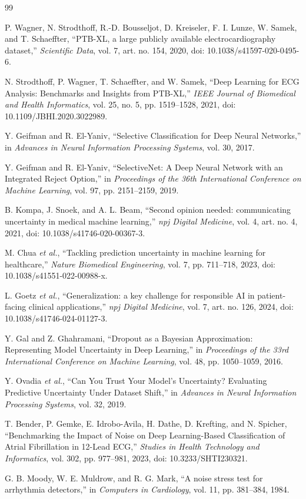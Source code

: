 \documentclass[journal]{IEEEtran}
\begin{document}
\balance
\begin{thebibliography}{99}

P. Wagner, N. Strodthoff, R.-D. Bousseljot, D. Kreiseler, F. I. Lunze, W. Samek, and T. Schaeffter, ``PTB-XL, a large publicly available electrocardiography dataset,'' \emph{Scientific Data}, vol. 7, art. no. 154, 2020, doi: 10.1038/s41597-020-0495-6.

N. Strodthoff, P. Wagner, T. Schaeffter, and W. Samek, ``Deep Learning for ECG Analysis: Benchmarks and Insights from PTB-XL,'' \emph{IEEE Journal of Biomedical and Health Informatics}, vol. 25, no. 5, pp. 1519--1528, 2021, doi: 10.1109/JBHI.2020.3022989.

Y. Geifman and R. El-Yaniv, ``Selective Classification for Deep Neural Networks,'' in \emph{Advances in Neural Information Processing Systems}, vol. 30, 2017.

Y. Geifman and R. El-Yaniv, ``SelectiveNet: A Deep Neural Network with an Integrated Reject Option,'' in \emph{Proceedings of the 36th International Conference on Machine Learning}, vol. 97, pp. 2151--2159, 2019.

B. Kompa, J. Snoek, and A. L. Beam, ``Second opinion needed: communicating uncertainty in medical machine learning,'' \emph{npj Digital Medicine}, vol. 4, art. no. 4, 2021, doi: 10.1038/s41746-020-00367-3.

M. Chua \emph{et al.}, ``Tackling prediction uncertainty in machine learning for healthcare,'' \emph{Nature Biomedical Engineering}, vol. 7, pp. 711--718, 2023, doi: 10.1038/s41551-022-00988-x.

L. Goetz \emph{et al.}, ``Generalization: a key challenge for responsible AI in patient-facing clinical applications,'' \emph{npj Digital Medicine}, vol. 7, art. no. 126, 2024, doi: 10.1038/s41746-024-01127-3.

Y. Gal and Z. Ghahramani, ``Dropout as a Bayesian Approximation: Representing Model Uncertainty in Deep Learning,'' in \emph{Proceedings of the 33rd International Conference on Machine Learning}, vol. 48, pp. 1050--1059, 2016.

Y. Ovadia \emph{et al.}, ``Can You Trust Your Model's Uncertainty? Evaluating Predictive Uncertainty Under Dataset Shift,'' in \emph{Advances in Neural Information Processing Systems}, vol. 32, 2019.

T. Bender, P. Gemke, E. Idrobo-Avila, H. Dathe, D. Krefting, and N. Spicher, ``Benchmarking the Impact of Noise on Deep Learning-Based Classification of Atrial Fibrillation in 12-Lead ECG,'' \emph{Studies in Health Technology and Informatics}, vol. 302, pp. 977--981, 2023, doi: 10.3233/SHTI230321.

G. B. Moody, W. E. Muldrow, and R. G. Mark, ``A noise stress test for arrhythmia detectors,'' in \emph{Computers in Cardiology}, vol. 11, pp. 381--384, 1984.

\end{thebibliography}
\end{document}

